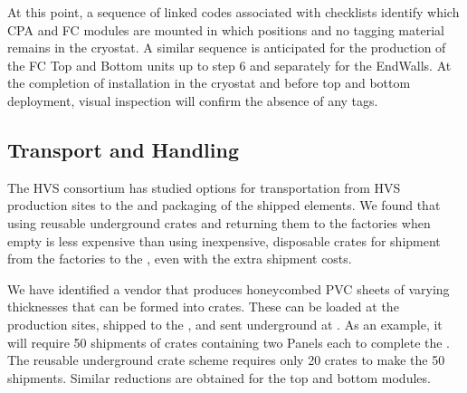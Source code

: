 At this point, %
a sequence of linked codes associated with  checklists %
identify which CPA and FC modules %
are mounted in %
which  positions and no tagging material remains in the cryostat.  A similar sequence is anticipated for the production of the FC Top and Bottom units up to step 6 and separately for the EndWalls.  
At the completion of installation in the cryostat and before  top and bottom deployment, visual inspection will confirm the absence of any tags.

\subsection{Transport and Handling}
\label{sec:fdsp-hv-transport-transport}

The HVS consortium has studied %
options for %
transportation from HVS production sites %
to the  %
and packaging of the shipped elements. %
We found that using reusable underground 
crates and returning them to the factories when empty is less expensive than using inexpensive, disposable crates for shipment from the factories to the ,  
even with the extra shipment costs. %

We have identified a vendor that %
produces honeycombed PVC sheets of varying thicknesses that can be formed into crates. These %
can be loaded at the production sites, %
shipped to the , and sent underground at \surf.  
As an example, %
it will require 50 shipments of crates containing two  Panels each to complete the .  %
The reusable underground crate scheme requires only 20 crates to make the 50 shipments. Similar reductions are obtained for the top and bottom  modules. 


